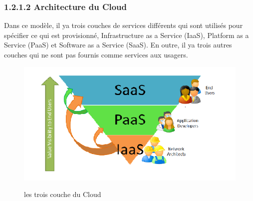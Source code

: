                 \subsubsection{1.2.1.2 Architecture du Cloud}
            Dans ce modèle, il ya trois couches de services différents qui sont utilisés pour spécifier ce qui est provisionné, Infrastructure as a Service (IaaS), Platform as a Service (PaaS) et Software as a Service (SaaS). En outre, il ya trois autres couches qui ne sont pas fournis comme services aux usagers. \\
            \begin{figure}[H]
            \centering
            \includegraphics[width=12cm]{trois_couche_cloud}\\
             \caption{les trois couche du Cloud}\label{trois_couche_cloud}
            \end{figure}
